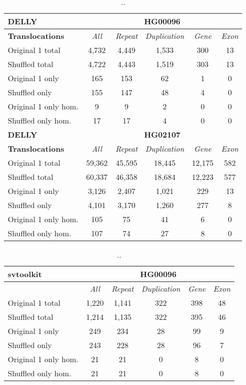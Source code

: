\begin{table}[htb]
\caption{ .. }
\begin{center}
\begin{tabular}{|l|c||c|c|c|c|}
\hline
{\bf DELLY} & \multicolumn{5}{|c|}{\bf HG00096} \\
\hline
\cline{2-6}
{\bf Translocations} & {\it All} & {\it Repeat} & {\it Duplication} & {\it Gene} & {\it Exon} \\
\hline
Original 1 total & 4,732 & 4,449 & 1,533 & 300 & 13\\ 
\hline
Shuffled total & 4,722 & 4,443 & 1,519 & 303 & 13\\ 
\hline
Original 1 only & 165 & 153 & 62 & 1 & 0\\ 
\hline
Shuffled only & 155 & 147 & 48 & 4 & 0\\ 
\hline
Original 1 only hom. & 9 & 9 & 2 & 0 & 0\\ 
\hline
Shuffled only hom. & 17 & 17 & 4 & 0 & 0\\ 
\hline
\hline
{\bf DELLY} & \multicolumn{5}{|c|}{\bf HG02107} \\
\hline
\cline{2-6}
{\bf Translocations} & {\it All} & {\it Repeat} & {\it Duplication} & {\it Gene} & {\it Exon} \\
\hline
Original 1 total & 59,362 & 45,595 & 18,445 & 12,175 & 582\\ 
\hline
Shuffled total & 60,337 & 46,358 & 18,684 & 12,223 & 577\\ 
\hline
Original 1 only & 3,126 & 2,407 & 1,021 & 229 & 13\\ 
\hline
Shuffled only & 4,101 & 3,170 & 1,260 & 277 & 8\\ 
\hline
Original 1 only hom. & 105 & 75 & 41 & 6 & 0\\ 
\hline
Shuffled only hom. & 107 & 74 & 27 & 8 & 0\\ 
\hline
\end{tabular}
\end{center}
\label{tab:orig-vs-shuf-delly-trans}
\end{table}

\begin{table}[htb]
\caption{ .. }
\begin{center}
\begin{tabular}{|l|c||c|c|c|c|}
\hline
{\bf svtoolkit} & \multicolumn{5}{|c|}{\bf HG00096} \\
\hline
\cline{2-6}
{\bf} & {\it All} & {\it Repeat} & {\it Duplication} & {\it Gene} & {\it Exon} \\
\hline
Original 1 total & 1,220 & 1,141 & 322 & 398 & 48 \\
\hline
Shuffled total & 1,214 & 1,135 & 322 & 395 & 46 \\
\hline
Original 1 only & 249 & 234 & 28 & 99 & 9\\ 
\hline
Shuffled only & 243 & 228 & 28 & 96 & 7\\
\hline
Original 1 only hom. & 21 & 21 & 0 & 8 & 0\\ 
\hline
Shuffled only hom. & 21 & 21 & 0 & 8 & 0\\  
\hline
\end{tabular}
\end{center}
\label{tab:orig-vs-shuf-svtoolkit}
\end{table}

